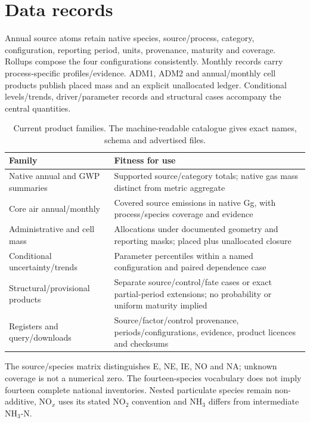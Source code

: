 \section{Data records}\label{sec:records}
Annual source atoms retain native species, source/process, category, configuration, reporting period, units, provenance, maturity and coverage. Rollups compose the four configurations consistently. Monthly records carry process-specific profiles/evidence. ADM1, ADM2 and annual/monthly cell products publish placed mass and an explicit unallocated ledger. Conditional levels/trends, driver/parameter records and structural cases accompany the central quantities.

\begin{table}[htbp]\centering\small
\begin{tabular}{@{}p{.25\linewidth}p{.64\linewidth}@{}}\toprule
Family & Fitness for use\\\midrule
Native annual and GWP summaries & Supported source/category totals; native gas mass distinct from metric aggregate\\
Core air annual/monthly & Covered source emissions in native Gg, with process/species coverage and evidence\\
Administrative and cell mass & Allocations under documented geometry and reporting masks; placed plus unallocated closure\\
Conditional uncertainty/trends & Parameter percentiles within a named configuration and paired dependence case\\
Structural/provisional products & Separate source/control/fate cases or exact partial-period extensions; no probability or uniform maturity implied\\
Registers and query/downloads & Source/factor/control provenance, periods/configurations, evidence, product licences and checksums\\\bottomrule
\end{tabular}
\caption{Current product families. The machine-readable catalogue gives exact names, schema and advertised files.}\label{tab:products}
\end{table}

The source/species matrix distinguishes E, NE, IE, NO and NA; unknown coverage is not a numerical zero. The fourteen-species vocabulary does not imply fourteen complete national inventories. Nested particulate species remain non-additive, NO$_x$ uses its stated NO$_2$ convention and NH$_3$ differs from intermediate NH$_3$-N.

